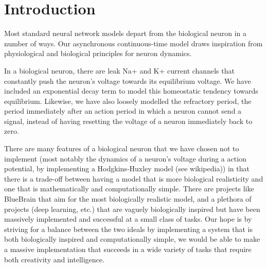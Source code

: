 \section{Introduction}

Most standard neural network models depart from the biological neuron in a number of ways. Our asynchronous continuous-time model draws inspiration from physiological and biological principles for neuron dynamics.

In a biological neuron, there are leak Na+ and K+ current channels that constantly push the neuron's voltage towards its equilibrium voltage. We have included an exponential decay term to model this homeostatic tendency towards equilibrium. Likewise, we have also loosely modelled the refractory period, the period immediately after an action period in which a neuron cannot send a signal, instead of having resetting the voltage of a neuron immediately back to zero.

There are many features of a biological neuron that we have chosen not to implement (most notably the dynamics of a neuron's voltage during a action potential, by implementing a Hodgkins-Huxley model (see wikipedia)) in that there is a trade-off between having a model that is more biological realisticity and one that is mathematically and computationally simple. There are projects like BlueBrain that aim for the most biologically realistic model, and a plethora of projects (deep learning, etc.) that are vaguely biologically inspired but have been massively implemented and successful at a small class of tasks. Our hope is by striving for a balance between the two ideals by implementing a system that is both biologically inspired and computationally simple, we would be able to make a massive implementation that succeeds in a wide variety of tasks that require both creativity and intelligence.


